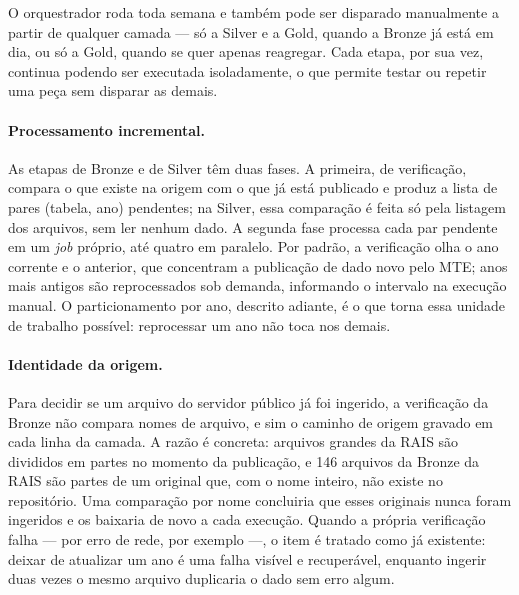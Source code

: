 O orquestrador roda toda semana e também pode ser disparado manualmente a partir de qualquer camada --- só a Silver e a Gold, quando a Bronze já está em dia, ou só a Gold, quando se quer apenas reagregar. Cada etapa, por sua vez, continua podendo ser executada isoladamente, o que permite testar ou repetir uma peça sem disparar as demais.

\paragraph{Processamento incremental.} As etapas de Bronze e de Silver têm duas fases. A primeira, de verificação, compara o que existe na origem com o que já está publicado e produz a lista de pares (tabela, ano) pendentes; na Silver, essa comparação é feita só pela listagem dos arquivos, sem ler nenhum dado. A segunda fase processa cada par pendente em um \textit{job} próprio, até quatro em paralelo. Por padrão, a verificação olha o ano corrente e o anterior, que concentram a publicação de dado novo pelo MTE; anos mais antigos são reprocessados sob demanda, informando o intervalo na execução manual. O particionamento por ano, descrito adiante, é o que torna essa unidade de trabalho possível: reprocessar um ano não toca nos demais.

\paragraph{Identidade da origem.} Para decidir se um arquivo do servidor público já foi ingerido, a verificação da Bronze não compara nomes de arquivo, e sim o caminho de origem gravado em cada linha da camada. A razão é concreta: arquivos grandes da RAIS são divididos em partes no momento da publicação, e 146 arquivos da Bronze da RAIS são partes de um original que, com o nome inteiro, não existe no repositório. Uma comparação por nome concluiria que esses originais nunca foram ingeridos e os baixaria de novo a cada execução. Quando a própria verificação falha --- por erro de rede, por exemplo ---, o item é tratado como já existente: deixar de atualizar um ano é uma falha visível e recuperável, enquanto ingerir duas vezes o mesmo arquivo duplicaria o dado sem erro algum.

